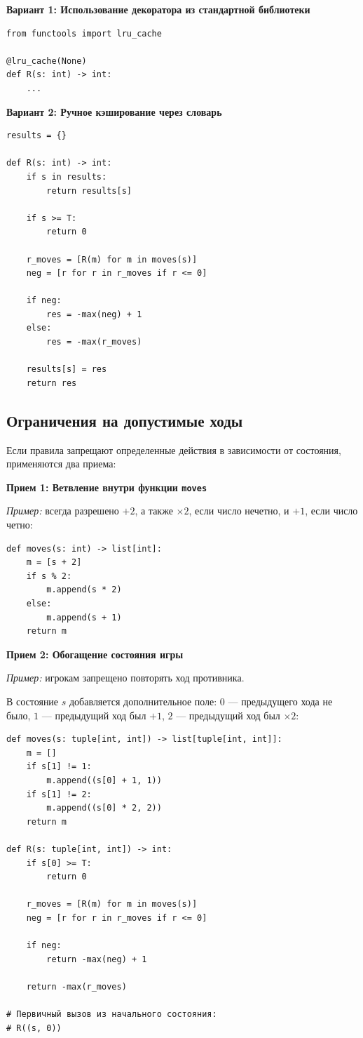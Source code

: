 \documentclass[11pt,a4paper]{article}
\begin{document}
\textbf{Вариант 1: Использование декоратора из стандартной библиотеки}
\begin{verbatim}
from functools import lru_cache

@lru_cache(None)
def R(s: int) -> int:
    ...
\end{verbatim}

\textbf{Вариант 2: Ручное кэширование через словарь}
\begin{verbatim}
results = {}

def R(s: int) -> int:
    if s in results:
        return results[s]
    
    if s >= T:
        return 0

    r_moves = [R(m) for m in moves(s)]
    neg = [r for r in r_moves if r <= 0]

    if neg:
        res = -max(neg) + 1
    else:
        res = -max(r_moves)
    
    results[s] = res
    return res
\end{verbatim}

\subsection{Ограничения на допустимые ходы}

Если правила запрещают определенные действия в зависимости от состояния, применяются два приема:

\textbf{Прием 1: Ветвление внутри функции \texttt{moves}}

\textit{Пример:} всегда разрешено $+2$, а также $\times 2$, если число нечетно, и $+1$, если число четно:
\begin{verbatim}
def moves(s: int) -> list[int]:
    m = [s + 2]
    if s % 2:
        m.append(s * 2)
    else:
        m.append(s + 1)
    return m
\end{verbatim}

\textbf{Прием 2: Обогащение состояния игры}

\textit{Пример:} игрокам запрещено повторять ход противника.

В состояние $s$ добавляется дополнительное поле: $0$ --- предыдущего хода не было, $1$ --- предыдущий ход был $+1$, $2$ --- предыдущий ход был $\times 2$:
\begin{verbatim}
def moves(s: tuple[int, int]) -> list[tuple[int, int]]:
    m = []
    if s[1] != 1:
        m.append((s[0] + 1, 1))
    if s[1] != 2:
        m.append((s[0] * 2, 2))
    return m

def R(s: tuple[int, int]) -> int:
    if s[0] >= T:
        return 0

    r_moves = [R(m) for m in moves(s)]
    neg = [r for r in r_moves if r <= 0]

    if neg:
        return -max(neg) + 1
    
    return -max(r_moves)

# Первичный вызов из начального состояния:
# R((s, 0))
\end{verbatim}
\end{document}
